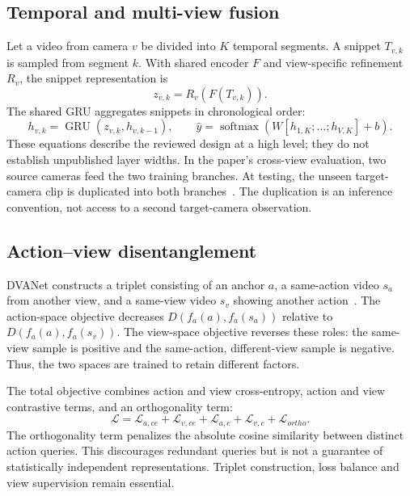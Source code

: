 \documentclass[runningheads]{llncs}
\begin{document}
\subsection{Temporal and multi-view fusion}
Let a video from camera $v$ be divided into $K$ temporal segments. A snippet $T_{v,k}$ is sampled from segment $k$. With shared encoder $F$ and view-specific refinement $R_v$, the snippet representation is
\begin{equation}
z_{v,k}=R_v(F(T_{v,k})).
\end{equation}
The shared GRU aggregates snippets in chronological order:
\begin{equation}
h_{v,k}=\operatorname{GRU}(z_{v,k},h_{v,k-1}),\qquad
\hat y=\operatorname{softmax}(W[h_{1,K};\ldots;h_{V,K}]+b).
\end{equation}
These equations describe the reviewed design at a high level; they do not establish unpublished layer widths. In the paper's cross-view evaluation, two source cameras feed the two training branches. At testing, the unseen target-camera clip is duplicated into both branches~\cite{bui}. The duplication is an inference convention, not access to a second target-camera observation.

\subsection{Action--view disentanglement}
DVANet constructs a triplet consisting of an anchor $a$, a same-action video $s_a$ from another view, and a same-view video $s_v$ showing another action~\cite{dva}. The action-space objective decreases $D(f_a(a),f_a(s_a))$ relative to $D(f_a(a),f_a(s_v))$. The view-space objective reverses these roles: the same-view sample is positive and the same-action, different-view sample is negative. Thus, the two spaces are trained to retain different factors.

The total objective combines action and view cross-entropy, action and view contrastive terms, and an orthogonality term:
\begin{equation}
\mathcal L=\mathcal L_{a,ce}+\mathcal L_{v,ce}+\mathcal L_{a,c}
+\mathcal L_{v,c}+\mathcal L_{ortho}.
\end{equation}
The orthogonality term penalizes the absolute cosine similarity between distinct action queries. This discourages redundant queries but is not a guarantee of statistically independent representations. Triplet construction, loss balance and view supervision remain essential.
\end{document}
